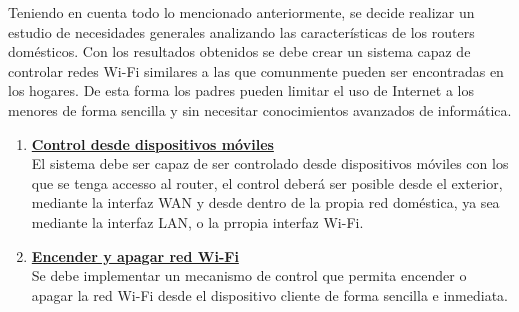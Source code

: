 \documentclass[12pt, twoside]{article}
\begin{document}
    Teniendo en cuenta todo lo mencionado anteriormente, se decide realizar un estudio de necesidades generales analizando las características de los routers domésticos. Con los resultados obtenidos se debe crear un sistema capaz de controlar redes Wi-Fi similares a las que comunmente pueden ser encontradas en los hogares. De esta forma  los padres pueden limitar el uso de Internet a los menores de forma sencilla y sin necesitar conocimientos avanzados de informática.
    \begin{enumerate}
        \item \textbf{\underline{Control desde dispositivos móviles}} \\
            El sistema debe ser capaz de ser controlado desde dispositivos móviles con los que se tenga accesso al router, el control deberá ser posible desde el exterior, mediante la interfaz WAN y desde dentro de la propia red doméstica, ya sea mediante la interfaz LAN, o la prropia interfaz Wi-Fi.
        
        \item \textbf{\underline{Encender y apagar red Wi-Fi}} \\
            Se debe implementar un mecanismo de control que permita encender o apagar la red Wi-Fi desde el dispositivo cliente de forma sencilla e inmediata.


\end{enumerate}
\end{document}
